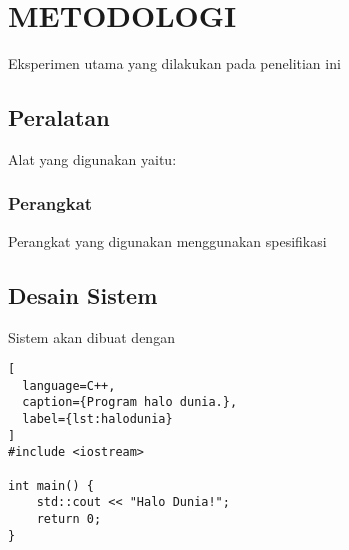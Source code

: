 \chapter{METODOLOGI}
\label{chap:metodologi}


Eksperimen utama yang dilakukan pada penelitian ini \lipsum[1][1-5]


\section{Peralatan}
\label{sec:peralatan}

Alat yang digunakan yaitu: \lipsum[1]

\subsection{Perangkat}
\label{subsec:perangkat}

Perangkat yang digunakan menggunakan spesifikasi \lipsum[1]

\section{Desain Sistem}
\label{sec:desainsistem}

Sistem akan dibuat dengan \lipsum[1-2]



\begin{lstlisting}[
  language=C++,
  caption={Program halo dunia.},
  label={lst:halodunia}
]
#include <iostream>

int main() {
    std::cout << "Halo Dunia!";
    return 0;
}
\end{lstlisting}

\lipsum[2-3]



\lipsum[4]
